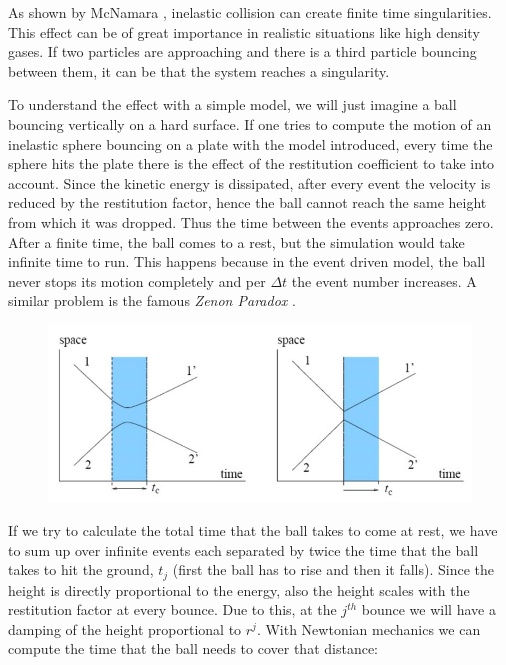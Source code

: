 As shown by McNamara \citep{inelastic_collapse1, inelastic_collapse2}, inelastic collision  can create finite time singularities. This effect can be of great importance in realistic situations like high density gases. If two particles are approaching and there is a third particle bouncing between them, it can be that the system reaches a singularity. 

To understand the effect with a simple model, we will just imagine a ball bouncing vertically on a hard surface. If one tries to compute the motion of an inelastic sphere bouncing on a plate with the model introduced, every time the sphere hits the plate there is the effect of the restitution coefficient to take into account.  Since the kinetic energy is dissipated, after every event the velocity is reduced by the restitution factor, hence the ball cannot reach the same height from which it was dropped. Thus the time between the events approaches zero. After a finite time, the ball comes to a rest, but the simulation would take infinite time to run. This happens because in the event driven model, the ball never stops its motion completely and per $\Delta t$ the event number increases. A similar problem is the famous \emph{Zenon Paradox} \citep{zeno}.


\begin{figure}[h!]
  \centering
  \includegraphics[width=.85\textwidth]{pics/hardpart_comp}
  \label{fig:comp_tcmolde}
\end{figure}



\vspace{0.2cm}
If we try to calculate the total time that the ball takes to come at rest, we have to sum up over infinite events each separated by twice the time that the ball takes to hit the ground, $t_j$ (first the ball has to rise and then it falls). Since the height is directly proportional to the energy, also the height scales with the restitution factor at every bounce.  Due to this, at the $j^{th}$  bounce we will have a damping of the height proportional to  $r^j$. With Newtonian mechanics we can compute the time that the ball needs to cover that distance:



